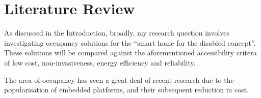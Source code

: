 \documentclass[../thesis/thesis.tex]{subfiles}
\begin{document}
\chapter{Literature Review}
 
As discussed in the Introduction, broadly, my research question involves investigating occupancy solutions for the ``smart home for the disabled concept''. These solutions will be compared against the aforementioned accessibility critera of low cost, non-invasiveness, energy efficiency and reliability.

The area of occupancy has seen a great deal of recent research due to the popularisation of embedded platforms, and their subsequent reduction in cost. 



\end{document}
